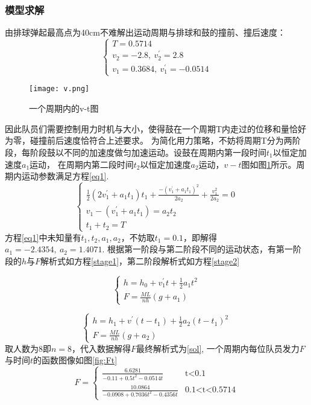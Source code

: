 \documentclass[withoutpreface,bwprint]{cumcmthesis} %
\begin{document}
\subsubsection{模型求解}
由排球弹起最高点为40cm不难解出运动周期与排球和鼓的撞前、撞后速度：
\begin{equation*}
\left\{
\begin{array}{lr}
T = 0.5714 \\
v_2 = -2.8,\ v_2^{'} = 2.8 \\
v_1 = 0.3684,\ v_1^{'} = -0.0514
\end{array}
\right.
\end{equation*}
\begin{figure}
	\centering
	\texttt{[image: v.png]}
	\caption{一个周期内的v-t图}
	\label{vt} %
\end{figure}
因此队员们需要控制用力时机与大小，使得鼓在一个周期T内走过的位移和量恰好为零，碰撞前后速度恰符合上述要求。
为简化用力策略，不妨将周期T分为两阶段，每阶段鼓以不同的加速度做匀加速运动。设鼓在周期内第一段时间$t_1$以恒定加速度$a_1$运动，
在周期内第二段时间$t_2$以恒定加速度$a_2$运动，$v-t$图如图\ref{vt}所示。周期内运动参数满足方程\ref{eq1}.
\begin{equation}
\left\{
\begin{array}{lr}
\frac{1}{2}(2v_1^{'}+a_1t_1)t_1 + \frac{-(v_1^{'}+a_1t_1)^2}{2a_2}+\frac{v_1^2}{2a_2} = 0 \\
v_1-(v_1^{'}+a_1t_1) = a_2t_2 \\
t_1 + t_2 = T
\end{array}
\label{eq1}
\right.
\end{equation}
方程\ref{eq1}中未知量有$t_1, t_2, a_1, a_2$，不妨取$t_1=0.1$，即解得$a_1 = -2.4354,\ a_2 = 1.4071$.
根据第一阶段与第二阶段不同的运动状态，有第一阶段的$h$与$F$解析式如方程\ref{stage1}，第二阶段解析式如方程\ref{stage2}

\begin{equation}
\left\{
\begin{array}{lr}
h=h_0+v_1^{'}t+\frac{1}{2}a_1t^2\\
F=\frac{ML}{nh}(g+a_1)
\end{array}
\right.
\label{stage1}
\end{equation}

\begin{equation}
\left\{
\begin{array}{lr}
h=h_1+v^{'}(t-t_1)+\frac{1}{2}a_2(t-t_1)^2\\
F=\frac{ML}{nh}(g+a_2)
\end{array}
\right.
\label{stage2}
\end{equation}
取人数为8即$n=8$，代入数据解得$F$最终解析式为\ref{sol}, 一个周期内每位队员发力$F$与时间$t$的函数图像如图\ref{fig:Ft}
\begin{equation}
F=
\begin{cases}
\frac{6.6281}{-0.11+0.5t^2-0.0514t}& \text{t<0.1}\\
\frac{10.0864}{-0.0908+0.7036t^2-0.4356t}& \text{0.1<t<0.5714}
\end{cases}
\label{sol}
\end{equation}
\end{document}
